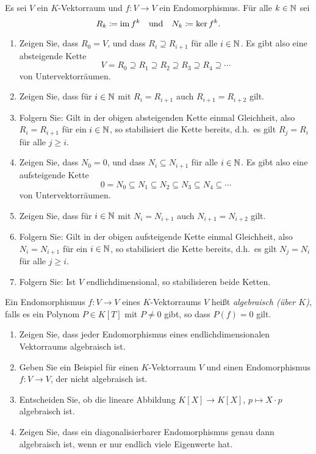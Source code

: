 \begin{question}[subtitle = Auf- und absteigende Ketten von Bild und Kern]{3}
  Es sei $V$ ein $K$-Vektorraum und $f \colon V \to V$ ein Endomorphismus.
  Für alle $k \in \mathbb{N}$ sei
  \[
    R_k \coloneqq \operatorname{im} f^k
    \quad\text{und}\quad
    N_k \coloneqq \ker f^k.
  \]
  \begin{enumerate}[leftmargin=*]
    \item
      Zeigen Sie, dass $R_0 = V$, und dass $R_i \supseteq R_{i+1}$ für alle $i \in \mathbb{N}$.
      Es gibt also eine absteigende Kette
      \[
        V = R_0 \supseteq R_1 \supseteq R_2 \supseteq R_3 \supseteq R_4 \supseteq \dotsb
      \]
      von Untervektorräumen.
    \item
      Zeigen Sie, dass für $i \in \mathbb{N}$ mit $R_i = R_{i+1}$ auch $R_{i+1} = R_{i+2}$ gilt.
    \item
      Folgern Sie:
      Gilt in der obigen absteigenden Kette einmal Gleichheit, also $R_i = R_{i+1}$ für ein $i \in \mathbb{N}$, so stabilisiert die Kette bereits, d.h.\ es gilt $R_j = R_i$ für alle $j \geq i$.
    \item
      Zeigen Sie, dass $N_0 = 0$, und dass $N_i \subseteq N_{i+1}$ für alle $i \in \mathbb{N}$.
      Es gibt also eine aufsteigende Kette
      \[
        0 = N_0 \subseteq N_1 \subseteq N_2 \subseteq N_3 \subseteq N_4 \subseteq \dotsb
      \]
      von Untervektorräumen.
    \item
      Zeigen Sie, dass für $i \in \mathbb{N}$ mit $N_i = N_{i+1}$ auch $N_{i+1} = N_{i+2}$ gilt.
    \item
      Folgern Sie:
      Gilt in der obigen aufsteigende Kette einmal Gleichheit, also $N_i = N_{i+1}$ für ein $i \in \mathbb{N}$, so stabilisiert die Kette bereits, d.h.\ es gilt $N_j = N_i$ für alle $j \geq i$.
    \item
      Folgern Sie:
      Ist $V$ endlichdimensional, so stabilisieren beide Ketten.
  \end{enumerate}
\end{question}


\begin{question}[subtitle = Algebraische Endomorphismen]{3}
  Ein Endomorphismus $f \colon V \to V$ eines $K$-Vektorraums $V$ heißt \emph{algebraisch (über $K$)}, falls es ein Polynom $P \in K[T]$ mit $P \neq 0$ gibt, so dass $P(f) = 0$ gilt.
  \begin{enumerate}[leftmargin=*]
    \item
      Zeigen Sie, dass jeder Endomorphismus eines endlichdimensionalen Vektorraums algebraisch ist.
    \item
      Geben Sie ein Beispiel für einen $K$-Vektorraum $V$ und einen Endomorphismus $f \colon V \to V$, der nicht algebraisch ist.
    \item
      Entscheiden Sie, ob die lineare Abbildung $K[X] \to K[X]$, $p \mapsto X \cdot p$ algebraisch ist.
    \item
      Zeigen Sie, dass ein diagonalisierbarer Endomorphismus genau dann algebraisch ist, wenn er nur endlich viele Eigenwerte hat.
  \end{enumerate}
\end{question}


